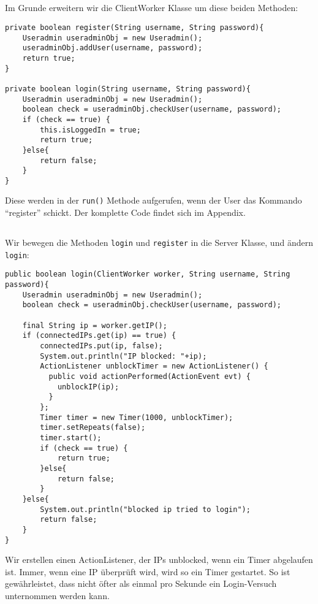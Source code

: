 \documentclass[10pt,a4paper]{article}
\begin{document}
\subsection{}
Im Grunde erweitern wir die ClientWorker Klasse um diese beiden Methoden:
\begin{verbatim}
private boolean register(String username, String password){
    Useradmin useradminObj = new Useradmin();
    useradminObj.addUser(username, password);
    return true;
}

private boolean login(String username, String password){
    Useradmin useradminObj = new Useradmin();
    boolean check = useradminObj.checkUser(username, password);
    if (check == true) {
        this.isLoggedIn = true;
        return true;
    }else{
        return false;
    }
}
\end{verbatim}
Diese werden in der \texttt{run()} Methode aufgerufen,
wenn der User das Kommando ``register'' schickt. Der komplette
Code findet sich im Appendix.

\newpage
\subsection{}
Wir bewegen die Methoden \texttt{login} und \texttt{register}
in die Server Klasse, und ändern \texttt{login}:
\begin{verbatim}
public boolean login(ClientWorker worker, String username, String password){
    Useradmin useradminObj = new Useradmin();
    boolean check = useradminObj.checkUser(username, password);
    
    final String ip = worker.getIP();
    if (connectedIPs.get(ip) == true) {
        connectedIPs.put(ip, false);
        System.out.println("IP blocked: "+ip);
        ActionListener unblockTimer = new ActionListener() {
          public void actionPerformed(ActionEvent evt) {
            unblockIP(ip);
          }
        };
        Timer timer = new Timer(1000, unblockTimer);
        timer.setRepeats(false);
        timer.start();
        if (check == true) {
            return true;
        }else{
            return false;
        }
    }else{
        System.out.println("blocked ip tried to login");
        return false;
    }
}
\end{verbatim}
Wir erstellen einen ActionListener, der IPs unblocked,
wenn ein Timer abgelaufen ist. Immer, wenn eine IP überprüft wird,
wird so ein Timer gestartet. So ist gewährleistet, dass nicht öfter
als einmal pro Sekunde ein Login-Versuch unternommen werden kann.
\end{document}
